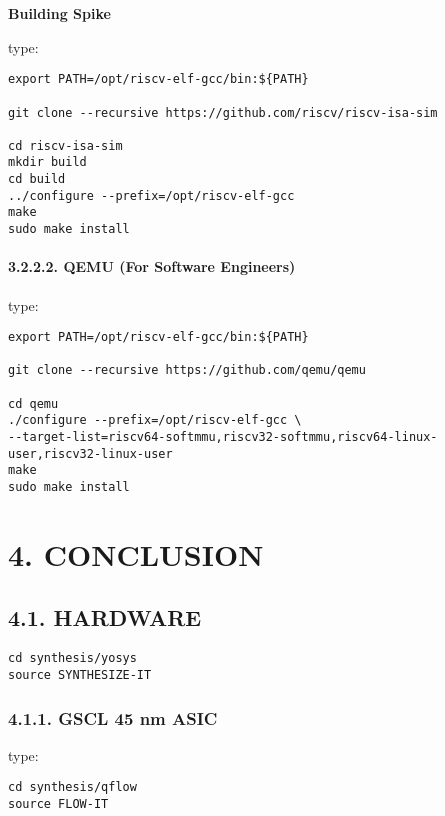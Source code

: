 \documentclass[]{article}
\let\oldparagraph\paragraph
\renewcommand{\paragraph}[1]{\oldparagraph{#1}\mbox{}}
\begin{document}
\textbf{Building Spike}

type:

\begin{verbatim}
export PATH=/opt/riscv-elf-gcc/bin:${PATH}

git clone --recursive https://github.com/riscv/riscv-isa-sim

cd riscv-isa-sim
mkdir build
cd build
../configure --prefix=/opt/riscv-elf-gcc
make
sudo make install
\end{verbatim}

\hypertarget{qemu-for-software-engineers}{%
\paragraph{3.2.2.2. QEMU (For Software
Engineers)}\label{qemu-for-software-engineers}}

type:

\begin{verbatim}
export PATH=/opt/riscv-elf-gcc/bin:${PATH}

git clone --recursive https://github.com/qemu/qemu

cd qemu
./configure --prefix=/opt/riscv-elf-gcc \
--target-list=riscv64-softmmu,riscv32-softmmu,riscv64-linux-user,riscv32-linux-user
make
sudo make install
\end{verbatim}

\hypertarget{conclusion}{%
\section{4. CONCLUSION}\label{conclusion}}

\hypertarget{hardware-1}{%
\subsection{4.1. HARDWARE}\label{hardware-1}}

\begin{verbatim}
cd synthesis/yosys
source SYNTHESIZE-IT
\end{verbatim}

\hypertarget{gscl-45-nm-asic}{%
\subsubsection{4.1.1. GSCL 45 nm ASIC}\label{gscl-45-nm-asic}}

type:

\begin{verbatim}
cd synthesis/qflow
source FLOW-IT
\end{verbatim}
\end{document}
